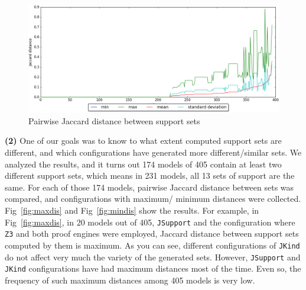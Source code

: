 \begin{figure}
  \centering
  \includegraphics[width=\textwidth]{figs/jacdis.png}
  \caption{\small{Pairwise Jaccard distance between support sets}}\label{fig:jacdis}
\end{figure}

\vspace{6pt}
\noindent{}
 \vspace{9pt}

\textbf{(2)} One of our goals was to know to what extent computed support sets are different, and which configurations have generated more different/similar sets. We analyzed the results,
and it turns out 174 models of 405 contain at least two different support sets, which means in 231 models, all 13 sets of support are the same. For each of those 174 models, pairwise Jaccard distance between sets was compared, and configurations with maximum/ minimum distances were collected. Fig~\ref{fig:maxdis} and Fig~\ref{fig:mindis} show the results. For example, in Fig~\ref{fig:maxdis}, in 20 models out of 405, \texttt{JSupport} and the configuration where \texttt{Z3} and both proof engines were employed, Jaccard distance between support sets computed by them is maximum. As you can see, different configurations of \texttt{JKind} do not affect very much the variety of the generated sets. However, \texttt{JSupport} and \texttt{JKind} configurations have had maximum distances most of the time. Even so, the frequency of such maximum distances among 405 models is very low.


